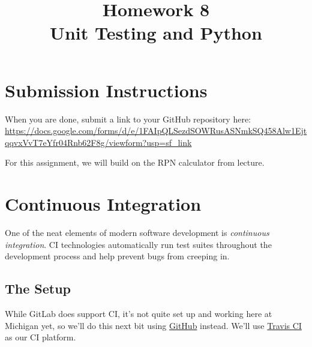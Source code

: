 \documentclass{article}
\begin{document}
\fancyfoot[C]{\color{gray} \thepage~/~\pageref*{LastPage}}
\pagestyle{fancyplain}

\title{\textbf{Homework 8\\Unit Testing and Python}}
\author{\textbf{\color{red}{Due: Wednesday, November 8th, 11:59PM (Hard Deadline)}}}
\date{}
\maketitle


\section*{Submission Instructions}
When you are done, submit a link to your GitHub repository here: \url{https://docs.google.com/forms/d/e/1FAIpQLSezdSOWRusASNmkSQ458Alw1EjtqqvxVvT7eYfr04Rnb62F8g/viewform?usp=sf_link}


\bigskip

\begin{mdframed}\centering
For this assignment, we will build on the RPN calculator from lecture.
\end{mdframed}



\section{Continuous Integration}
One of the neat elements of modern software development is \emph{continuous
  integration}. CI technologies automatically run test suites throughout the
development process and help prevent bugs from creeping in.

\subsection{The Setup}

While GitLab does support CI, it's not quite set up and working here at
Michigan yet, so we'll do this next bit using
\href{https://github.com}{GitHub} instead.
We'll use \href{https://travis-ci.org/}{Travis CI} as our CI platform.
\end{document}
